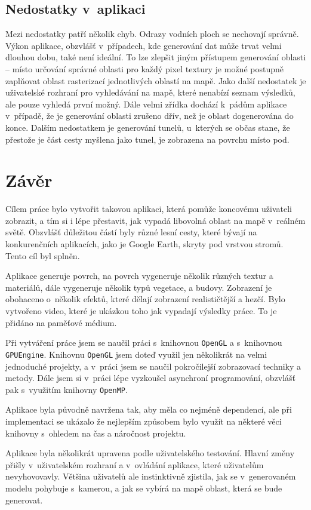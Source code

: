 \section{Nedostatky v~aplikaci}
Mezi nedostatky patří několik chyb. Odrazy vodních ploch se nechovají správně. Výkon aplikace, obzvlášť v~případech, kde generování dat může trvat velmi dlouhou dobu, také není ideální. To lze zlepšit jiným přístupem generování oblasti -- místo určování správné oblasti pro každý pixel textury je možné postupně zaplňovat oblast rasterizací jednotlivých oblastí na mapě. Jako další nedostatek je uživatelské rozhraní pro vyhledávání na mapě, které nenabízí seznam výsledků, ale pouze vyhledá první možný. Dále velmi zřídka dochází k~pádům aplikace v~případě, že je generování oblasti zrušeno dřív, než je oblast dogenerována do konce. Dalším nedostatkem je generování tunelů, u~kterých se občas stane, že přestože je část cesty myšlena jako tunel, je zobrazena na povrchu místo pod.


\chapter{Závěr}
Cílem práce bylo vytvořit takovou aplikaci, která pomůže koncovému uživateli zobrazit, a tím si i lépe přestavit, jak vypadá libovolná oblast na mapě v~reálném světě. Obzvlášť důležitou částí byly různé lesní cesty, které bývají na konkurenčních aplikacích, jako je Google Earth, skryty pod vrstvou stromů. Tento cíl byl splněn.

Aplikace generuje povrch, na povrch vygeneruje několik různých textur a materiálů, dále vygeneruje několik typů vegetace, a budovy. Zobrazení je obohaceno o~několik efektů, které dělají zobrazení realističtější a hezčí.
Bylo vytvořeno video, které je ukázkou toho jak vypadají výsledky práce. To je přidáno na paměťové médium.

Při vytváření práce jsem se naučil práci s~knihovnou \verb|OpenGL| a s~knihovnou \verb|GPUEngine|. Knihovnu \verb|OpenGL| jsem doteď využil jen několikrát na velmi jednoduché projekty, a v~práci jsem se naučil pokročilejší zobrazovací techniky a metody. Dále jsem si v~práci lépe vyzkoušel asynchroní programování, obzvlášť pak s~využitím knihovny \verb|OpenMP|.

Aplikace byla původně navržena tak, aby měla co nejméně dependencí, ale při implementaci se ukázalo že nejlepším způsobem bylo využít na některé věci knihovny s~ohledem na čas a náročnost projektu.

Aplikace byla několikrát upravena podle uživatelského testování. Hlavní změny přišly v~uživatelském rozhraní a v~ovládání aplikace, které uživatelům nevyhovovavly. Většina uživatelů ale instinktivně zjistila, jak se v~generovaném modelu pohybuje s~kamerou, a jak se vybírá na mapě oblast, která se bude generovat.

